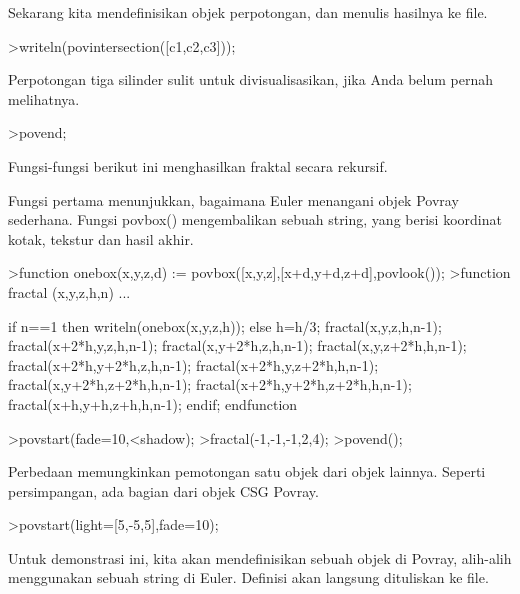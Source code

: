 \documentclass[a4paper,10pt]{article}
\begin{document}
\begin{eulernotebook}
\begin{eulercomment}
\begin{eulercomment}
\begin{eulercomment}
\begin{eulercomment}
\begin{eulercomment}
\begin{eulercomment}
\begin{eulercomment}
\begin{eulercomment}
\begin{eulercomment}
\begin{eulercomment}
\begin{eulerttcomment}
\end{eulerttcomment}
\begin{eulercomment}
Sekarang kita mendefinisikan objek perpotongan, dan menulis hasilnya
ke file.
\end{eulercomment}
\begin{eulerprompt}
>writeln(povintersection([c1,c2,c3]));
\end{eulerprompt}
\begin{eulercomment}
Perpotongan tiga silinder sulit untuk divisualisasikan, jika Anda
belum pernah melihatnya.
\end{eulercomment}
\begin{eulerprompt}
>povend;
\end{eulerprompt}
\begin{eulercomment}
Fungsi-fungsi berikut ini menghasilkan fraktal secara rekursif.

Fungsi pertama menunjukkan, bagaimana Euler menangani objek Povray
sederhana. Fungsi povbox() mengembalikan sebuah string, yang berisi
koordinat kotak, tekstur dan hasil akhir.
\end{eulercomment}
\begin{eulerprompt}
>function onebox(x,y,z,d) := povbox([x,y,z],[x+d,y+d,z+d],povlook());
>function fractal (x,y,z,h,n) ...
\end{eulerprompt}
\begin{eulerudf}
   if n==1 then writeln(onebox(x,y,z,h));
   else
     h=h/3;
     fractal(x,y,z,h,n-1);
     fractal(x+2*h,y,z,h,n-1);
     fractal(x,y+2*h,z,h,n-1);
     fractal(x,y,z+2*h,h,n-1);
     fractal(x+2*h,y+2*h,z,h,n-1);
     fractal(x+2*h,y,z+2*h,h,n-1);
     fractal(x,y+2*h,z+2*h,h,n-1);
     fractal(x+2*h,y+2*h,z+2*h,h,n-1);
     fractal(x+h,y+h,z+h,h,n-1);
   endif;
  endfunction
\end{eulerudf}
\begin{eulerprompt}
>povstart(fade=10,<shadow);
>fractal(-1,-1,-1,2,4);
>povend();
\end{eulerprompt}
\begin{eulercomment}
Perbedaan memungkinkan pemotongan satu objek dari objek lainnya.
Seperti persimpangan, ada bagian dari objek CSG Povray.
\end{eulercomment}
\begin{eulerprompt}
>povstart(light=[5,-5,5],fade=10);
\end{eulerprompt}
\begin{eulercomment}
Untuk demonstrasi ini, kita akan mendefinisikan sebuah objek di
Povray, alih-alih menggunakan sebuah string di Euler. Definisi akan
langsung dituliskan ke file.


\end{eulercomment}
\end{eulercomment}
\end{eulercomment}
\end{eulercomment}
\end{eulercomment}
\end{eulercomment}
\end{eulercomment}
\end{eulercomment}
\end{eulercomment}
\end{eulercomment}
\end{eulercomment}
\end{eulernotebook}
\end{document}
